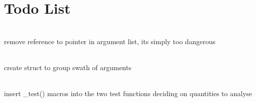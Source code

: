 \chapter{Todo List }
\hypertarget{todo}{}\label{todo}

\begin{DoxyRefList}
\item[Member \doxylink{namespacecsmp_a19ecc57bb9af10e0f707f09a6c603c23}{csmp\+::add\+Cell\+Centroid} (\doxylink{classcsmp_1_1_polygon_grid_manager}{Polygon\+Grid\+Manager} \texorpdfstring{$\ast$}{*}pgm, map\texorpdfstring{$<$}{<} set$<$ size\+\_\+t $>$, \doxylink{classcsmp_1_1_grid_node}{Grid\+Node} \texorpdfstring{$\ast$}{*} \texorpdfstring{$>$}{>} \&additional\+\_\+points, set\texorpdfstring{$<$}{<} set$<$ size\+\_\+t $>$ \texorpdfstring{$>$}{>} \&additional\+\_\+edges, \doxylink{classcsmp_1_1_grid_node}{Grid\+Node} \texorpdfstring{$\ast$}{*}\&cgn, const \doxylink{classvector}{vector$<$ Grid\+Node \texorpdfstring{$\ast$}{*} $>$} \&nodes, const vector\texorpdfstring{$<$}{<} \doxylink{classvector}{vector$<$ size\+\_\+t $>$} \texorpdfstring{$>$}{>} \&face\+\_\+nodes)]\hfill \\
\label{todo__todo000123}%
%
remove reference to pointer in argument list, it\textquotesingle{}s simply too dangerous  
\item[Member \doxylink{namespacecsmp_a707ff681e66cc222039b51699395c03f}{csmp\+::add\+Hexa\+Cell\+To} (Cell\+::\+Vector \&, \doxylink{classcsmp_1_1_grid_node}{Grid\+Node} \texorpdfstring{$\ast$}{*}const, \doxylink{classcsmp_1_1_grid_node}{Grid\+Node} \texorpdfstring{$\ast$}{*}const, \doxylink{classcsmp_1_1_grid_node}{Grid\+Node} \texorpdfstring{$\ast$}{*}const, \doxylink{classcsmp_1_1_grid_node}{Grid\+Node} \texorpdfstring{$\ast$}{*}const, \doxylink{classcsmp_1_1_grid_node}{Grid\+Node} \texorpdfstring{$\ast$}{*}const, \doxylink{classcsmp_1_1_grid_node}{Grid\+Node} \texorpdfstring{$\ast$}{*}const, \doxylink{classcsmp_1_1_grid_node}{Grid\+Node} \texorpdfstring{$\ast$}{*}const, \doxylink{classcsmp_1_1_grid_node}{Grid\+Node} \texorpdfstring{$\ast$}{*}const)]\hfill \\
\label{todo__todo000120}%
%
create struct to group swath of arguments  
\item[Class \doxylink{classcsmp_1_1_a_n_s_y_s___split_boundary_match___test}{csmp\+::ANSYS\+\_\+\+Split\+Boundary\+Match\+\_\+\+Test} ]\hfill \\
\label{todo__todo000252}%
%
insert \+\_\+test() macros into the two test functions deciding on quantities to analyse 




\end{DoxyRefList}
